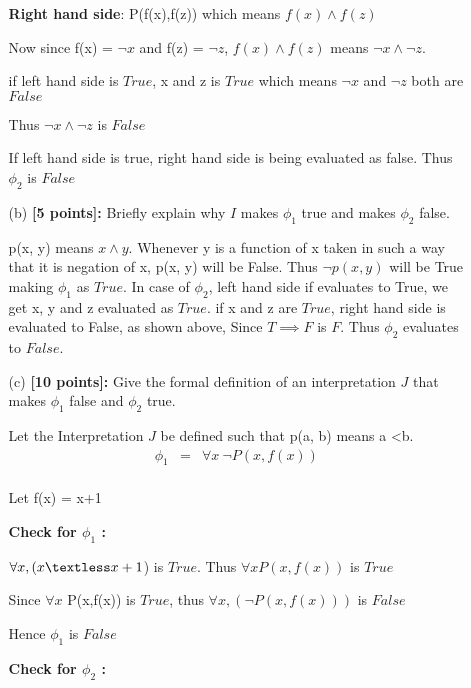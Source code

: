 \documentclass{article}
\begin{document}
\begin{enumerate}
\begin{itemize}
\begin{answer}
    
    \textbf{Right hand side}: P(f(x),f(z)) which means $f(x)\land f(z)$  
    
    Now since f(x) = $\neg x$  and f(z) = $\neg z$, $f(x)\land f(z)$ means $\neg x \land \neg z$.
    
    if left hand side is $True$, x and z is $True$ which means $\neg x$ and $\neg z$ both are $False$
    
    Thus $\neg x \land \neg z$ is $False$
    
    If left hand side is true, right hand side is being evaluated as false. Thus $\phi_2$ is \textbf{$False$}
          
\end{answer}
  \item[(b)] \textbf{[5 points]:} Briefly explain why $I$ makes
    $\phi_1$ true and makes $\phi_2$ false.
   \begin{answer} 
    p(x, y) means $x \land y$. Whenever y is a function of x taken in such a way that it is negation of x, p(x, y)
     will be False. Thus $\neg p(x, y)$ will be True making $\phi_1$ as $True$. In case of  $\phi_2$, left hand side if evaluates to True, we get x, y and z evaluated as $True$. if x and z are $True$, right hand side is evaluated to False, as shown above, Since $T \implies F$ is $F$. Thus $\phi_2$ evaluates to $False$.
      
\end{answer}
  \item[(c)] \textbf{[10 points]:} Give the formal definition of an
    interpretation $J$ that makes $\phi_1$ false and $\phi_2$ true.
    
    \begin{answer}
       Let the Interpretation $J$ be defined such that p(a, b) means  a \textless b.
       \begin{eqnarray*}
    \phi_1 
    & =
    & \forall x \ \neg P(x,f(x)) \\
    \end {eqnarray*}
    
    Let f(x) = x+1
    
   \textbf{Check for $\phi_1$ :}    
    
    $\forall x,(x  \textless  x+1$) is $True$. Thus $\forall x  P(x,f(x))$ is $True$
    
    
    Since $\forall x$ P(x,f(x)) is $True$, thus $\forall x,(\neg  P(x,f(x)))$ is $False $
    
    
    Hence $\phi_1$ is $False$
    
   \textbf{Check for $\phi_2$ :}
    

\end{answer}
\end{itemize}
\end{enumerate}
\end{document}
